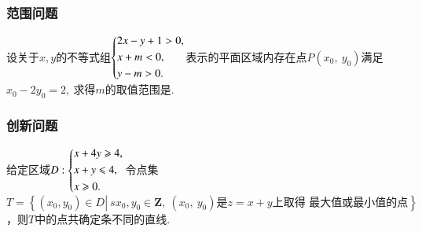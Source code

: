 \documentclass{BHCexam}
\begin{document}
\subsubsection{范围问题}
\begin{example}
设关于$ x,y $的不等式组$\begin{dcases}
2x-y+1>0,\\
x+m<0,\\
y-m>0.
\end{dcases}$表示的平面区域内存在点$ P(x_0,~y_0) $满足$ x_0-2y_0=2,~ $求得$ m $的取值范围是\tk.
\end{example}

\subsubsection{创新问题}
\begin{example}
给定区域$ D:\begin{dcases}
x+4y\ge 4,\\
x+y\le 4,\\
x\ge 0.
\end{dcases} $令点集$ T=\left\{\left(x_0,y_0\right)\in D\left|\ sx_0,y_0\in \mathbf{Z},~(x_0,~y_0)\text{是}z=x+y\right.\text{上取得 最大值或最小值的点}\right\} $，则$ T $中的点共确定\tk 条不同的直线.
\end{example}
\end{document}
